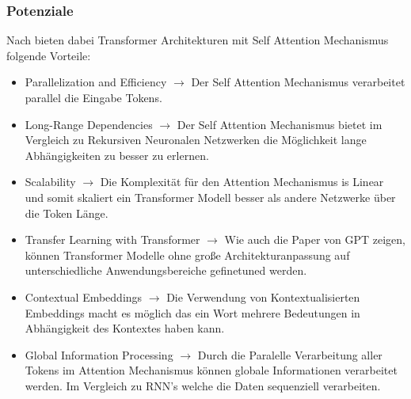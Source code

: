 \documentclass[conference]{IEEEtran}
\begin{document}
\subsubsection{Potenziale}
Nach \cite{kulkarniAppliedGenerativeAI2023} bieten dabei Transformer Architekturen mit Self Attention Mechanismus folgende Vorteile:
\begin{itemize}
    \item Parallelization and Efficiency $\rightarrow$ Der Self Attention Mechanismus verarbeitet parallel die Eingabe Tokens.
    \item Long-Range Dependencies $\rightarrow$ Der Self Attention Mechanismus bietet im Vergleich zu Rekursiven Neuronalen Netzwerken die Möglichkeit lange Abhängigkeiten zu besser zu erlernen.
    \item Scalability $\rightarrow$ Die Komplexität für den Attention Mechanismus is Linear und somit skaliert ein Transformer Modell besser als andere Netzwerke über die Token Länge.
    \item Transfer Learning with Transformer $\rightarrow$ Wie auch die Paper von GPT zeigen, können Transformer Modelle ohne große Architekturanpassung auf unterschiedliche Anwendungsbereiche gefinetuned werden.
    \item Contextual Embeddings $\rightarrow$ Die Verwendung von Kontextualisierten Embeddings macht es möglich das ein Wort mehrere Bedeutungen in Abhängigkeit des Kontextes haben kann.
    \item Global Information Processing $\rightarrow$ Durch die Paralelle Verarbeitung aller Tokens im Attention Mechanismus können globale Informationen verarbeitet werden. Im Vergleich zu RNN's welche die Daten sequenziell verarbeiten.
\end{itemize}
\end{document}
